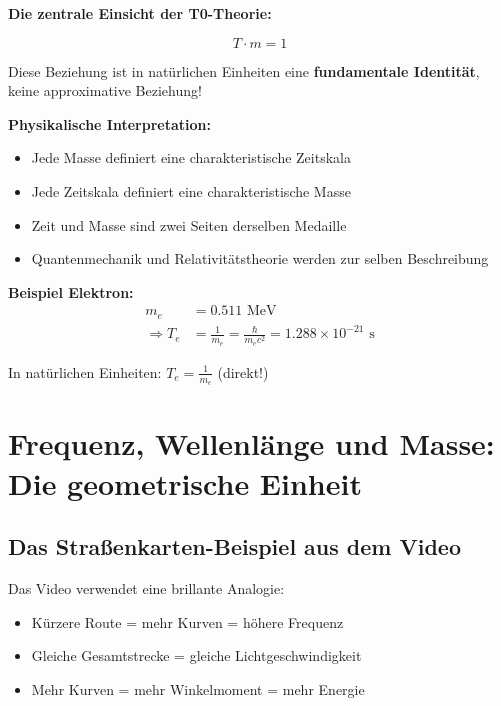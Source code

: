 	\begin{vorteil}
		\textbf{Die zentrale Einsicht der T0-Theorie:}
		
		\begin{equation}
			\boxed{T \cdot m = 1}
		\end{equation}
		
		Diese Beziehung ist in natürlichen Einheiten eine \textbf{fundamentale Identität}, keine approximative Beziehung!
		
		\textbf{Physikalische Interpretation:}
		\begin{itemize}
			\item Jede Masse definiert eine charakteristische Zeitskala
			\item Jede Zeitskala definiert eine charakteristische Masse
			\item Zeit und Masse sind zwei Seiten derselben Medaille
			\item Quantenmechanik und Relativitätstheorie werden zur selben Beschreibung
		\end{itemize}
		
		\textbf{Beispiel Elektron:}
		\begin{align}
			m_e &= 0.511 \text{ MeV} \\
			\Rightarrow T_e &= \frac{1}{m_e} = \frac{\hbar}{m_e c^2} = 1.288 \times 10^{-21} \text{ s}
		\end{align}
		
		In natürlichen Einheiten: $T_e = \frac{1}{m_e}$ (direkt!)
	\end{vorteil}
	
	\section{Frequenz, Wellenlänge und Masse: Die geometrische Einheit}
	
	\subsection{Das Straßenkarten-Beispiel aus dem Video}
	
	Das Video verwendet eine brillante Analogie:
	\begin{itemize}
		\item Kürzere Route = mehr Kurven = höhere Frequenz
		\item Gleiche Gesamtstrecke = gleiche Lichtgeschwindigkeit
		\item Mehr Kurven = mehr Winkelmoment = mehr Energie
	\end{itemize}
	
